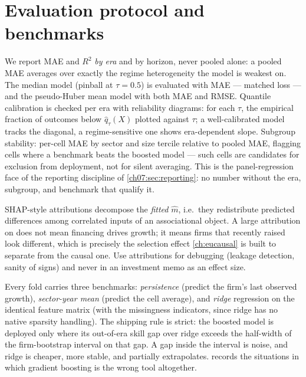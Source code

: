 \section{Evaluation protocol and benchmarks}\label{cheu:sec:eval}

We report MAE and $R^2$ \emph{by era} and by horizon, never pooled alone: a pooled MAE averages
over exactly the regime heterogeneity the model is weakest on. The median model (pinball at
$\tau = 0.5$) is evaluated with MAE --- matched loss --- and the pseudo-Huber mean model with
both MAE and RMSE. Quantile calibration is checked per era with reliability diagrams: for each
$\tau$, the empirical fraction of outcomes below $\hat q_\tau(X)$ plotted against $\tau$; a
well-calibrated model tracks the diagonal, a regime-sensitive one shows era-dependent slope.
Subgroup stability: per-cell MAE by sector and size tercile relative to pooled MAE, flagging
cells where a benchmark beats the boosted model --- such cells are candidates for exclusion from
deployment, not for silent averaging. This is the panel-regression face of the reporting
discipline of \cref{ch07:sec:reporting}: no number without the era, subgroup, and benchmark that
qualify it.

\begin{warning}\label{warn:xgb-shap}
SHAP-style attributions decompose the \emph{fitted} $\hat m$, i.e.\ they redistribute predicted
differences among correlated inputs of an associational object. A large attribution on
 does not mean financing drives growth; it means firms that
recently raised look different, which is precisely the selection effect \cref{ch:eucausal} is
built to separate from the causal one. Use attributions for debugging (leakage detection, sanity
of signs) and never in an investment memo as an effect size.
\end{warning}

Every fold carries three benchmarks: \emph{persistence} (predict the firm's last observed
growth), \emph{sector-year mean} (predict the cell average), and \emph{ridge} regression on the
identical feature matrix (with the missingness indicators, since ridge has no native sparsity
handling). The shipping rule is strict: the boosted model is deployed only where its out-of-era
skill gap over ridge exceeds the half-width of the firm-bootstrap interval on that gap. A gap
inside the interval is noise, and ridge is cheaper, more stable, and partially extrapolates.
 records the situations in which gradient boosting is the wrong tool
altogether.

